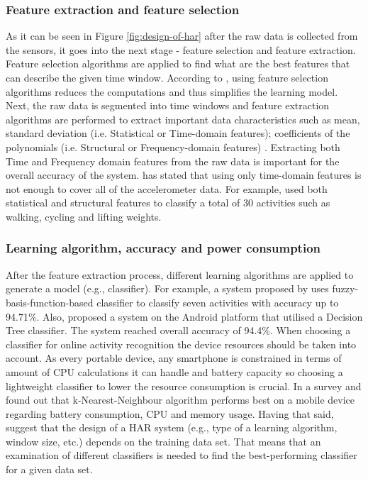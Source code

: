         \subsubsection{Feature extraction and feature selection}
        As it can be seen in Figure \ref{fig:design-of-har} after the raw data is collected from the sensors, it goes into the next stage - feature selection and feature extraction. Feature selection algorithms are applied to find what are the best features that can describe the given time window. According to \citet[21-22]{labrador2013}, using feature selection algorithms reduces the computations and thus simplifies the learning model. Next, the raw data is segmented into time windows \citep[2]{capela2016} and feature extraction algorithms are performed to extract important data characteristics such as mean, standard deviation (i.e. Statistical or Time-domain features); coefficients of the polynomials (i.e. Structural or Frequency-domain features) \citep[722]{lara2012a}. Extracting both Time and Frequency domain features from the raw data is important for the overall accuracy of the system. \citet[269]{wang2015} has stated that using only time-domain features is not enough to cover all of the accelerometer data. For example, \citet[]{tapia2007} used both statistical and structural features to classify a total of 30 activities such as walking, cycling and lifting weights.
        
        \subsubsection{Learning algorithm, accuracy and power consumption}
        After the feature extraction process, different learning algorithms are applied to generate a model (e.g., classifier). For example, a system proposed by \citet[116]{kao2009} uses fuzzy-basis-function-based classifier to classify seven activities with accuracy up to 94.71\%. Also, \citet[918]{anjum2013} proposed a system on the Android platform that utilised a Decision Tree classifier. The system reached overall accuracy of 94.4\%. When choosing a classifier for online activity recognition the device resources should be taken into account. As every portable device, any smartphone is constrained in terms of amount of CPU calculations it can handle and battery capacity so choosing a lightweight classifier to lower the resource consumption is crucial. In a survey \citet[2068]{shoaib2015} and \citet[226]{ayu2012} found out that k-Nearest-Neighbour algorithm performs best on a mobile device regarding battery consumption, CPU and memory usage. Having that said, \citet[1193]{lara2013} suggest that the design of a HAR system (e.g., type of a learning algorithm, window size, etc.) depends on the training data set. That means that an examination of different classifiers is needed to find the best-performing classifier for a given data set.
        
